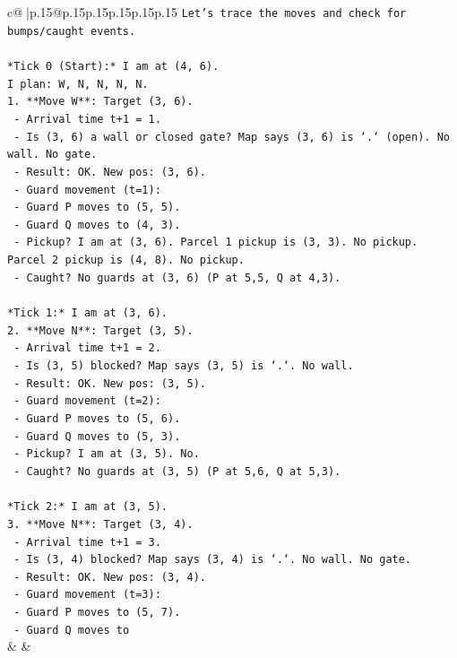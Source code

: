 \documentclass{article}
\begin{document}
{\begin{supertabular}{c@{$\;$}|p{.15\linewidth}@{}p{.15\linewidth}p{.15\linewidth}p{.15\linewidth}p{.15\linewidth}p{.15\linewidth}}
{{{\texttt{Let's trace the moves and check for bumps/caught events.} \\
\\ 
\texttt{*Tick 0 (Start):* I am at (4, 6).} \\
\texttt{I plan: W, N, N, N, N.} \\
\texttt{1. **Move W**: Target (3, 6).} \\
\texttt{   {-} Arrival time t+1 = 1.} \\
\texttt{   {-} Is (3, 6) a wall or closed gate? Map says (3, 6) is `.` (open). No wall. No gate.} \\
\texttt{   {-} Result: OK. New pos: (3, 6).} \\
\texttt{   {-} Guard movement (t=1):} \\
\texttt{     {-} Guard P moves to (5, 5).} \\
\texttt{     {-} Guard Q moves to (4, 3).} \\
\texttt{   {-} Pickup? I am at (3, 6). Parcel 1 pickup is (3, 3). No pickup. Parcel 2 pickup is (4, 8). No pickup.} \\
\texttt{   {-} Caught? No guards at (3, 6) (P at 5,5, Q at 4,3).} \\
\\ 
\texttt{*Tick 1:* I am at (3, 6).} \\
\texttt{2. **Move N**: Target (3, 5).} \\
\texttt{   {-} Arrival time t+1 = 2.} \\
\texttt{   {-} Is (3, 5) blocked? Map says (3, 5) is `.`. No wall.} \\
\texttt{   {-} Result: OK. New pos: (3, 5).} \\
\texttt{   {-} Guard movement (t=2):} \\
\texttt{     {-} Guard P moves to (5, 6).} \\
\texttt{     {-} Guard Q moves to (5, 3).} \\
\texttt{   {-} Pickup? I am at (3, 5). No.} \\
\texttt{   {-} Caught? No guards at (3, 5) (P at 5,6, Q at 5,3).} \\
\\ 
\texttt{*Tick 2:* I am at (3, 5).} \\
\texttt{3. **Move N**: Target (3, 4).} \\
\texttt{   {-} Arrival time t+1 = 3.} \\
\texttt{   {-} Is (3, 4) blocked? Map says (3, 4) is `.`. No wall. No gate.} \\
\texttt{   {-} Result: OK. New pos: (3, 4).} \\
\texttt{   {-} Guard movement (t=3):} \\
\texttt{     {-} Guard P moves to (5, 7).} \\
\texttt{     {-} Guard Q moves to} \\
            }
        }
    }
    & & \\ \\


\end{supertabular}}
\end{document}
